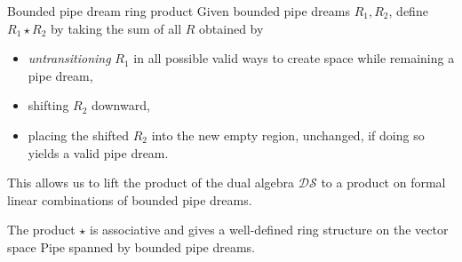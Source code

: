 \documentclass[aspectratio=169]{beamer}
\newcommand{\dcoma}{\mathcal{DS}}
\newcommand{\RC}{\mathrm{Pipe}}
\begin{document}
\begin{frame}{Bounded pipe dream ring product}
Given bounded pipe dreams $R_1,R_2$, define $R_1\star R_2$ by taking the sum of all $R$ obtained by
\begin{itemize}
  \item \emph{untransitioning} $R_1$ in all possible valid ways to create space while remaining a pipe dream,
  \item shifting $R_2$ downward,
  \item placing the shifted $R_2$ into the new empty region, unchanged, if doing so yields a valid pipe dream.
\end{itemize}
This allows us to lift the product of the dual algebra $\dcoma$ to a product on formal linear combinations of bounded pipe dreams.
\begin{theorem}[S, 2026+]
The product $\star$ is associative and gives a well-defined ring structure on the vector space $\RC$ spanned by bounded pipe dreams.
\end{theorem}
\end{frame}
\end{document}
